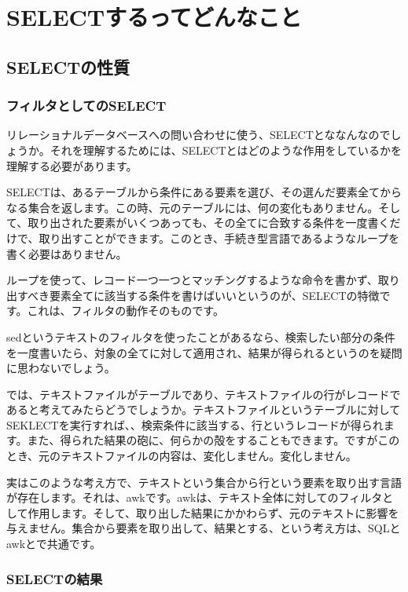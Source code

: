 \chapter{SELECTするってどんなこと}

\section{SELECTの性質}

\subsection{フィルタとしてのSELECT}

リレーショナルデータベースへの問い合わせに使う、SELECTとななんなのでしょうか。それを理解するためには、SELECTとはどのような作用をしているかを理解する必要があります。

SELECTは、あるテーブルから条件にある要素を選び、その選んだ要素全てからなる集合を返します。この時、元のテーブルには、何の変化もありません。そして、取り出された要素がいくつあっても、その全てに合致する条件を一度書くだけで、取り出すことができます。このとき、手続き型言語であるようなループを書く必要はありません。

ループを使って、レコード一つ一つとマッチングするような命令を書かず、取り出すべき要素全てに該当する条件を書けばいいというのが、SELECTの特徴です。これは、フィルタの動作そのものです。

sedというテキストのフィルタを使ったことがあるなら、検索したい部分の条件を一度書いたら、対象の全てに対して適用され、結果が得られるというのを疑問に思わないでしょう。

では、テキストファイルがテーブルであり、テキストファイルの行がレコードであると考えてみたらどうでしょうか。テキストファイルというテーブルに対してSEKLECTを実行すれば、、検索条件に該当する、行というレコードが得られます。また、得られた結果の砲に、何らかの殻をすることもできます。ですがこのとき、元のテキストファイルの内容は、変化しません。変化しません。

実はこのような考え方で、テキストという集合から行という要素を取り出す言語が存在します。それは、awkです。awkは、テキスト全体に対してのフィルタとして作用します。そして、取り出した結果にかかわらず、元のテキストに影響を与えません。集合から要素を取り出して、結果とする、という考え方は、SQLとawkとで共通です。

\subsection{SELECTの結果}

